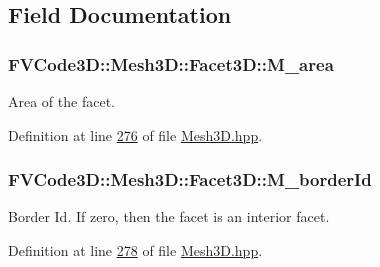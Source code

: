 \subsection{Field Documentation}
\subsubsection[{\texorpdfstring{M\+\_\+area}{M_area}}]{ F\+V\+Code3\+D\+::\+Mesh3\+D\+::\+Facet3\+D\+::\+M\+\_\+area\hspace{0.3cm}{\ttfamily [private]}}\hypertarget{classFVCode3D_1_1Mesh3D_1_1Facet3D_a464195f44615c5dcba666c6ec3fde430}{}\label{classFVCode3D_1_1Mesh3D_1_1Facet3D_a464195f44615c5dcba666c6ec3fde430}


Area of the facet. 



Definition at line \hyperlink{Mesh3D_8hpp_source_l00276}{276} of file \hyperlink{Mesh3D_8hpp_source}{Mesh3\+D.\+hpp}.

\subsubsection[{\texorpdfstring{M\+\_\+border\+Id}{M_borderId}}]{ F\+V\+Code3\+D\+::\+Mesh3\+D\+::\+Facet3\+D\+::\+M\+\_\+border\+Id\hspace{0.3cm}{\ttfamily [private]}}\hypertarget{classFVCode3D_1_1Mesh3D_1_1Facet3D_ad113bfcfe986c011457bfde02c6016a8}{}\label{classFVCode3D_1_1Mesh3D_1_1Facet3D_ad113bfcfe986c011457bfde02c6016a8}


Border Id. If zero, then the facet is an interior facet. 



Definition at line \hyperlink{Mesh3D_8hpp_source_l00278}{278} of file \hyperlink{Mesh3D_8hpp_source}{Mesh3\+D.\+hpp}.

